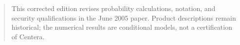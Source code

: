 \documentclass[11pt,letterpaper]{article}
\begin{document}
\maketitle
\begin{quote}\small
This corrected edition revises probability calculations, notation, and security
qualifications in the June 2005 paper. Product descriptions remain historical;
the numerical results are conditional models, not a certification of Centera.
\end{quote}
\begin{abstract}

\end{abstract}








\end{document}
